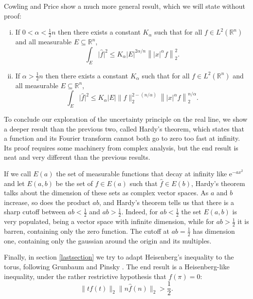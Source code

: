 \documentclass{amsart}
\newcommand{\R}{\mathbb{R}}
\newcommand{\e}{\mathrm{e}}
\begin{document}
Cowling and Price \cite{cp} show a much more general result, which we will state without proof:

\begin{enumerate}[i.]
\item If $0 < \alpha < \frac12 n$ then there exists a constant $K_\alpha$ such that for all $f \in L^2(\R^n)$ and all measurable $E \subseteq \R^n$,
\[\int_E \lvert \hat f \rvert^2 \leq K_\alpha \lvert E \rvert^{2 \alpha / n} \left\lVert \lvert x \rvert^\alpha f \right\rVert_2^2.\]

\item If $\alpha > \frac12 n$ then there exists a constant $K_\alpha$ such that for all $f \in L^2(\R^n)$ and all measurable $E \subseteq \R^n$,
\[\int_E \lvert \hat f \rvert^2 \leq K_\alpha \lvert E \rvert \lVert f \rVert_2^{2 - (n/\alpha)} \left\lVert \lvert x \rvert^\alpha f \right\rVert_2^{n/\alpha}.\]
\end{enumerate}

\bigskip

To conclude our exploration of the uncertainty principle on the real line, we show a deeper result than the previous two, called Hardy's theorem, which states that a function and its Fourier transform cannot both go to zero too fast at infinity. Its proof requires some machinery from complex analysis, but the end result is neat and very different than the previous results.

If we call $E(a)$ the set of measurable functions that decay at infinity like $\e^{-a x^2}$ and let $E(a,b)$ be the set of $f \in E(a)$ such that $\hat f \in E(b)$, Hardy's theorem talks about the dimension of these sets as complex vector spaces. As $a$ and $b$ increase, so does the product $ab$, and Hardy's theorem tells us that there is a sharp cutoff between $ab < \frac12$ and $ab > \frac12$. Indeed, for $ab < \frac12$ the set $E(a,b)$ is very populated, being a vector space with infinite dimension, while for $ab > \frac12$ it is barren, containing only the zero function. The cutoff at $ab = \frac12$ has dimension one, containing only the gaussian around the origin and its multiples.

\bigskip

Finally, in section \ref{lastsection} we try to adapt Heisenberg's inequality to the torus, following Grunbaum and Pinsky \cite{pinsky}. The end result is a Heisenberg-like inequality, under the rather restrictive hypothesis that $f(\pi) = 0$:
\[\lVert t f(t) \rVert_2 \lVert n \hat f(n) \rVert_2 > \frac12.\]
\end{document}

